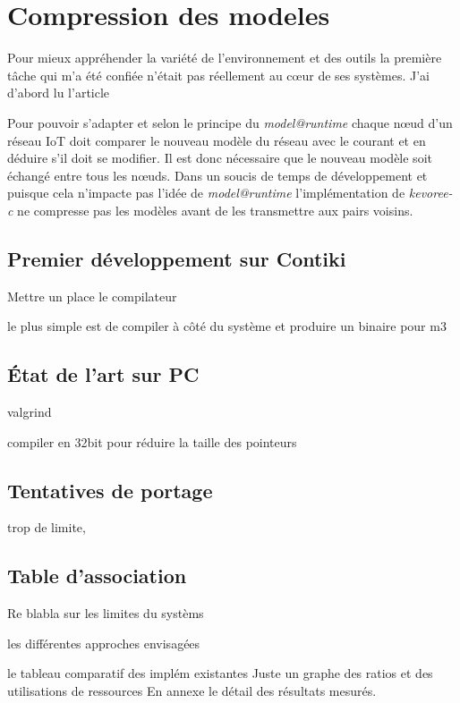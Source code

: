 \setcounter{section}{0}
\section{Compression des modeles}

Pour mieux appréhender la variété de l'environnement et des outils la première tâche qui m'a été confiée n'était pas réellement au cœur de ses systèmes. J'ai d'abord lu l'article \cite{acostapadilla}


Pour pouvoir s'adapter et selon le principe du \emph{model@runtime} chaque nœud d'un réseau IoT doit comparer le nouveau modèle du réseau avec le courant et en déduire s'il doit se modifier. Il est donc nécessaire que le nouveau modèle soit échangé entre tous les nœuds. Dans un soucis de temps de développement et puisque cela n'impacte pas l'idée de \emph{model@runtime} l'implémentation de \emph{kevoree-c} ne compresse pas les modèles avant de les transmettre aux pairs voisins.

\subsection{Premier développement sur Contiki}

Mettre un place le compilateur

le plus simple est de compiler à côté du système et produire un binaire pour m3

\subsection{État de l'art sur PC}

valgrind

compiler en 32bit pour réduire la taille des pointeurs

\subsection{Tentatives de portage}

trop de limite, 

\subsection{Table d'association}

Re blabla sur les limites du systèms

les différentes approches envisagées 

le tableau comparatif des implém existantes
Juste un graphe des ratios et des utilisations de ressources
En annexe le détail des résultats mesurés.


